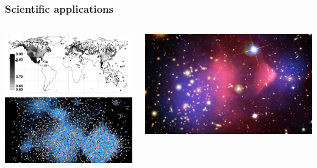 \documentclass{beamer}
\begin{document}

 \begin{frame}
   \frametitle{Scientific applications}
   \centering
   \begin{columns}
     \begin{column}{0.5\textwidth}
       \centering
       \includegraphics[width=0.8\columnwidth]{../figures/climate.jpg}\\
       \includegraphics[width=\columnwidth]{../figures/networks-2.jpg}
     \end{column}
     \begin{column}{0.5\textwidth}
       \includegraphics[width=\columnwidth]{../figures/dark_matter.jpg}

\end{column}
\end{columns}
\end{frame}
\end{document}
